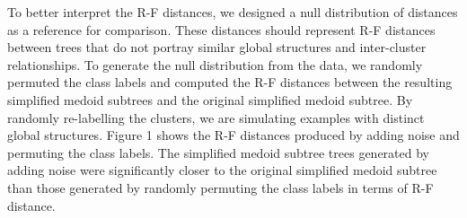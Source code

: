 \documentclass{article}
\begin{document}
To better interpret the R-F distances, we designed a null distribution of distances as a reference for comparison. These distances should represent R-F distances between trees that do not portray similar global structures and inter-cluster relationships. To generate the null distribution from the data, we randomly permuted the class labels and computed the R-F distances between the resulting simplified medoid subtrees and the original simplified medoid subtree. By randomly re-labelling the clusters, we are simulating examples with distinct global structures. Figure 1 shows the R-F distances produced by adding noise and permuting the class labels. The simplified medoid subtree trees generated by adding noise were significantly closer to the original simplified medoid subtree than those generated by randomly permuting the class labels in terms of R-F distance.

\newpage
\end{document}
